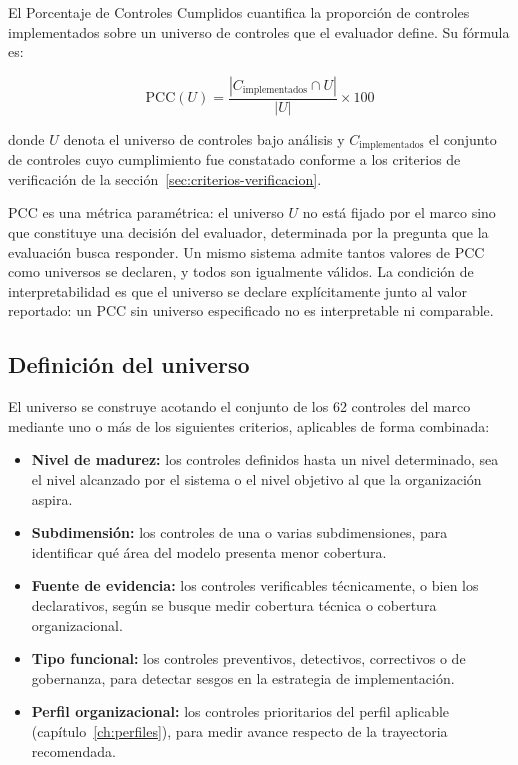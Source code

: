 El Porcentaje de Controles Cumplidos cuantifica la proporción de controles implementados sobre un universo de controles que el evaluador define. Su fórmula es:

\[
  \text{PCC}(U) = \frac{|C_{\text{implementados}} \cap U|}{|U|} \times 100
\]

donde $U$ denota el universo de controles bajo análisis y $C_{\text{implementados}}$ el conjunto de controles cuyo cumplimiento fue constatado conforme a los criterios de verificación de la sección~\ref{sec:criterios-verificacion}.

PCC es una métrica paramétrica: el universo $U$ no está fijado por el marco sino que constituye una decisión del evaluador, determinada por la pregunta que la evaluación busca responder. Un mismo sistema admite tantos valores de PCC como universos se declaren, y todos son igualmente válidos. La condición de interpretabilidad es que el universo se declare explícitamente junto al valor reportado: un PCC sin universo especificado no es interpretable ni comparable.

\subsection{Definición del universo}

El universo se construye acotando el conjunto de los 62 controles del marco mediante uno o más de los siguientes criterios, aplicables de forma combinada:

\begin{itemize}
  \item \textbf{Nivel de madurez:} los controles definidos hasta un nivel determinado, sea el nivel alcanzado por el sistema o el nivel objetivo al que la organización aspira.
  \item \textbf{Subdimensión:} los controles de una o varias subdimensiones, para identificar qué área del modelo presenta menor cobertura.
  \item \textbf{Fuente de evidencia:} los controles verificables técnicamente, o bien los declarativos, según se busque medir cobertura técnica o cobertura organizacional.
  \item \textbf{Tipo funcional:} los controles preventivos, detectivos, correctivos o de gobernanza, para detectar sesgos en la estrategia de implementación.
  \item \textbf{Perfil organizacional:} los controles prioritarios del perfil aplicable (capítulo~\ref{ch:perfiles}), para medir avance respecto de la trayectoria recomendada.
\end{itemize}

